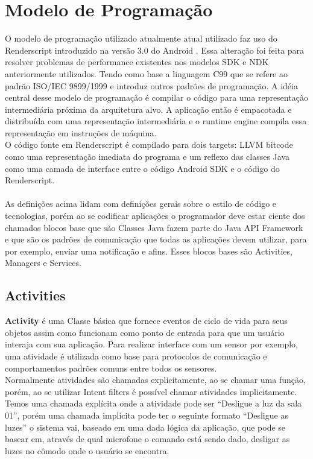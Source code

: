 \documentclass[12pt]{article}
\begin{document}
\section{Modelo de Programação}
O modelo de programação utilizado atualmente atual utilizado faz uso do Renderscript introduzido na versão 3.0 do Android \cite{apache}. Essa alteração foi  feita para resolver problemas de performance existentes nos modelos SDK e NDK anteriormente utilizados. Tendo como base a linguagem C99 que se refere ao padrão ISO/IEC 9899/1999 \cite{wiki:c99} e introduz outros padrões de programação. A idéia central desse modelo de programação é compilar o código para uma representação intermediária próxima da arquitetura alvo. A aplicação então é empacotada e distribuída com uma representação intermediária e o runtime engine compila essa representação em instruções de máquina.
\\O código fonte em Renderscript é compilado para dois targets: LLVM bitcode como uma representação imediata do programa e um reflexo das classes Java como uma camada de interface entre o código Android SDK e o código do Renderscript.
\\\\As definições acima lidam com definições gerais sobre o estilo de código e tecnologias, porém ao se codificar aplicações o programador deve estar ciente dos chamados blocos base que são Classes Java fazem parte do Java API Framework e que são os padrões de comunicação que todas as aplicações devem utilizar, para por exemplo, enviar uma notificação e afins. Esses blocos bases são Activities, Managers e Services.
\subsection{Activities}
\textbf{Activity} é uma Classe básica que fornece eventos de ciclo de vida para seus objetos assim como funcionam como ponto de entrada para que um usuário interaja com sua aplicação. Para realizar interface com um sensor por exemplo, uma atividade é utilizada como base para protocolos de comunicação e comportamentos padrões comuns entre todos os sensores. 
\\Normalmente atividades são chamadas explicitamente, ao se chamar uma função, porém, ao se utilizar Intent filters é possível chamar atividades implicitamente. Temos uma chamada explícita onde a atividade pode ser “Desligue a luz da sala 01”, porém uma chamada implícita pode ter o seguinte formato “Desligue as luzes” o sistema vai, baseado em uma dada lógica da aplicação, que pode se basear em, através de qual microfone o comando está sendo dado, desligar as luzes no cômodo onde o usuário se encontra.
\end{document}
